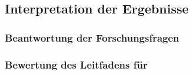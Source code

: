 \subsection{Interpretation der Ergebnisse}

\subsubsection{Beantwortung der Forschungsfragen}

\subsubsection{Bewertung des Leitfadens für }